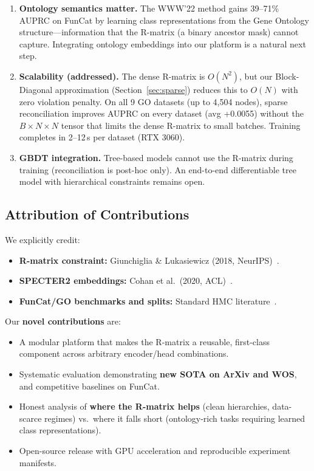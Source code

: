 \documentclass[11pt,a4paper]{article}
\begin{document}
\begin{enumerate}[leftmargin=*,nosep]
  \item \textbf{Ontology semantics matter.} The WWW'22 method gains
    39--71\% AUPRC on FunCat by learning class representations from
    the Gene Ontology structure---information that the R-matrix (a
    binary ancestor mask) cannot capture. Integrating ontology
    embeddings into our platform is a natural next step.
  \item \textbf{Scalability (addressed).} The dense R-matrix is $O(N^2)$,
    but our Block-Diagonal approximation (Section~\ref{sec:sparse})
    reduces this to $O(N)$ with zero violation penalty.  On all 9 GO
    datasets (up to 4,504 nodes), sparse reconciliation improves
    AUPRC on every dataset (avg +0.0055) without the
    $B \times N \times N$ tensor that limits the dense R-matrix to
    small batches.  Training completes in 2--12\,s per
    dataset (RTX 3060).
  \item \textbf{GBDT integration.} Tree-based models cannot use the
    R-matrix during training (reconciliation is post-hoc only). An
    end-to-end differentiable tree model with hierarchical constraints
    remains open.
\end{enumerate}

\subsection{Attribution of Contributions}

We explicitly credit:
\begin{itemize}[leftmargin=*,nosep]
  \item \textbf{R-matrix constraint:} Giunchiglia \& Lukasiewicz (2018,
    NeurIPS)~\cite{giunchiglia2018hmc}.
  \item \textbf{SPECTER2 embeddings:} Cohan et al.~(2020,
    ACL)~\cite{specter}.
  \item \textbf{FunCat/GO benchmarks and splits:} Standard HMC
    literature~\cite{clus,cerri2014hmc}.
\end{itemize}

Our \textbf{novel contributions} are:
\begin{itemize}[leftmargin=*,nosep]
  \item A modular platform that makes the R-matrix a reusable,
    first-class component across arbitrary encoder/head combinations.
  \item Systematic evaluation demonstrating \textbf{new SOTA on ArXiv
    and WOS}, and competitive baselines on FunCat.
  \item Honest analysis of \textbf{where the R-matrix helps} (clean
    hierarchies, data-scarce regimes) vs.\ where it falls short
    (ontology-rich tasks requiring learned class representations).
  \item Open-source release with GPU acceleration and reproducible
    experiment manifests.
\end{itemize}
\end{document}

